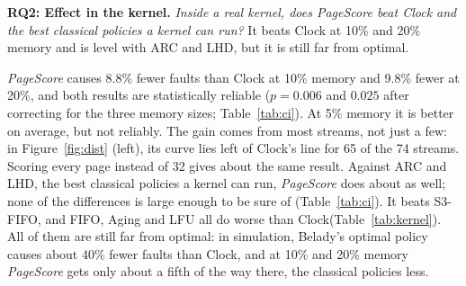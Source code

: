 \documentclass{article}
\newcommand{\figdata}{figures/data}
\newcommand{\clock}{Clock\xspace}
\newcommand{\belady}{Belady\xspace}
\DeclareRobustCommand{\pagescore}{\textit{PageScore}}
\newcommand{\wsixteen}{figures/data/w16}
\newcommand{\rqbox}[3]{\par\smallskip\noindent\textbf{#1.} \emph{#2} #3\par}
\begin{document}
\rqbox{RQ2: Effect in the kernel}{Inside a real kernel, does \pagescore{} beat \clock and the best classical policies a kernel can run?}{It beats \clock at 10\% and 20\% memory and is level with ARC and LHD, but it is still far from optimal.}\label{sec:eval-kernel}

\begin{table}[t]
\caption{\textbf{Every policy on every workload, in the xv6 kernel, at 10\% memory} (74 streams). Faults relative to \clock: one column per workload, averaged over its streams, and the average over the 14 workloads in the last column. S3-FIFO, LeCaR, LHD and ARC use only the accessed bit. \pagescore{} is our policy; ``\pagescore{}, every page'' is the same score over every page.}
\label{tab:kernel}
\vskip 0.1in
\begin{center}
\resizebox{\textwidth}{!}{}
\end{center}
\vskip -0.1in
\end{table}

\begin{table}[t]
\caption{\pagescore{} against the main policies in the kernel: its faults relative to the other policy's (below 1: \pagescore{} has fewer), over all 74 streams, with the 95\% interval underneath. Bold: the whole interval is below 0.99 (\S\ref{sec:eval-setup}). Last row: ARC against \clock.}
\label{tab:ci}
\vskip 0.1in
\begin{center}
{\small }
\end{center}
\vskip -0.1in
\end{table}

\pagescore{} causes 8.8\% fewer faults than \clock at 10\% memory and 9.8\% fewer at 20\%, and both results are statistically reliable ($p=0.006$ and $0.025$ after correcting for the three memory sizes; Table~\ref{tab:ci}). At 5\% memory it is better on average, but not reliably. The gain comes from most streams, not just a few: in Figure~\ref{fig:dist} (left), its curve lies left of \clock's line for 65 of the 74 streams. Scoring every page instead of 32 gives about the same result. Against ARC and LHD, the best classical policies a kernel can run, \pagescore{} does about as well; none of the differences is large enough to be sure of (Table~\ref{tab:ci}). It beats S3-FIFO, and FIFO, Aging and LFU all do worse than \clock (Table~\ref{tab:kernel}). All of them are still far from optimal: in simulation, \belady's optimal policy causes about 40\% fewer faults than \clock, and at 10\% and 20\% memory \pagescore{} gets only about a fifth of the way there, the classical policies less.
\end{document}
